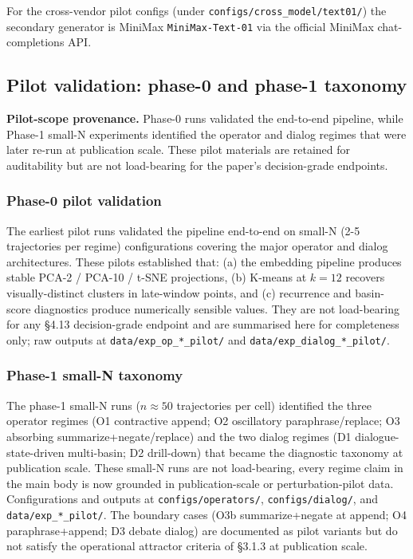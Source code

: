 \documentclass{article}
\theoremstyle{plain}
\theoremstyle{definition}
\begin{document}
For the cross-vendor pilot configs (under \texttt{configs/cross\_model/text01/})
the secondary generator is MiniMax \texttt{MiniMax-Text-01} via the official
MiniMax chat-completions API.

\subsection{Pilot validation: phase-0 and phase-1 taxonomy}

\textbf{Pilot-scope provenance.} Phase-0 runs validated the end-to-end pipeline, while Phase-1 small-N experiments identified the operator and dialog regimes that were later re-run at publication scale. These pilot materials are retained for auditability but are not load-bearing for the paper's decision-grade endpoints.

\subsubsection*{Phase-0 pilot validation}

The earliest pilot runs validated the pipeline end-to-end on small-N
(2-5 trajectories per regime) configurations covering the major
operator and dialog architectures. These pilots established that:
(a) the embedding pipeline produces stable PCA-2 / PCA-10 / t-SNE
projections, (b) K-means at $k = 12$ recovers visually-distinct
clusters in late-window points, and (c) recurrence and basin-score
diagnostics produce numerically sensible values. They are not
load-bearing for any §4.13 decision-grade endpoint and are summarised
here for completeness only; raw outputs at \texttt{data/exp\_op\_*\_pilot/} and
\texttt{data/exp\_dialog\_*\_pilot/}.

\subsubsection*{Phase-1 small-N taxonomy}

The phase-1 small-N runs ($n \approx 50$ trajectories per cell)
identified the three operator regimes (O1 contractive append; O2
oscillatory paraphrase/replace; O3 absorbing summarize+negate/replace)
and the two dialog regimes (D1 dialogue-state-driven multi-basin; D2 drill-down)
that became the diagnostic taxonomy at publication scale. These
small-N runs are not load-bearing, every regime claim in the main
body is now grounded in publication-scale or perturbation-pilot
data. Configurations and outputs at \texttt{configs/operators/},
\texttt{configs/dialog/}, and \texttt{data/exp\_*\_pilot/}. The boundary cases (O3b
summarize+negate at append; O4 paraphrase+append; D3 debate dialog)
are documented as pilot variants but do not satisfy the operational
attractor criteria of §3.1.3 at publication scale.
\end{document}
